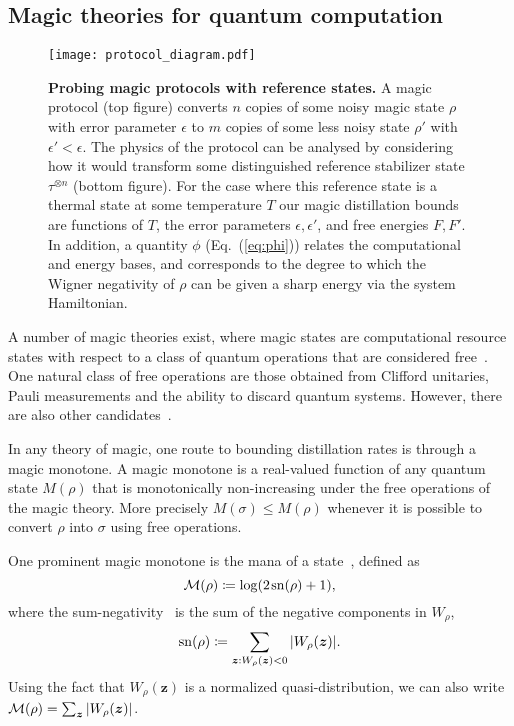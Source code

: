 \documentclass[
onecolumn,
superscriptaddress
]{revtex4-1}
\def\z{\boldsymbol{z}}
\def\M{{\cal M}}
\begin{document}
\subsection*{Magic theories for quantum computation}
\begin{figure}[t]
    \centering
        \texttt{[image: protocol\_diagram.pdf]}
    \caption{\textbf{Probing magic protocols with reference states.} 
	A magic protocol (top figure) converts $n$ copies of some noisy magic state $\rho$ with error parameter $\epsilon$ to $m$ copies of some less noisy state $\rho'$ with $\epsilon' < \epsilon$. The physics of the protocol can be analysed by considering how it would transform some distinguished reference stabilizer state $\tau^{\otimes n}$ (bottom figure). For the case where this reference state is a thermal state at some temperature $T$ our magic distillation bounds are functions of $T$, the error parameters $\epsilon, \epsilon'$, and free energies $F, F'$. In addition, a quantity $\phi$ (Eq.~(\ref{eq:phi})) relates the computational and energy bases, and corresponds to the degree to which the Wigner negativity of $\rho$ can be given a sharp energy via the system Hamiltonian.}
    \label{fig:sketch}
\end{figure}
A number of magic theories exist, where magic states are computational resource states with respect to a class of quantum operations that are considered free~\cite{Gour_2019}. One natural class of free operations are those obtained from Clifford unitaries, Pauli measurements and the ability to discard quantum systems. However, there are also other candidates~\cite{cit:ahmadi, cit:seddon, Wang_2019}.

In any theory of magic, one route to bounding distillation rates is through a magic monotone. A magic monotone is a real-valued function of any quantum state $M(\rho)$ that is monotonically non-increasing under the free operations of the magic theory. More precisely $M(\sigma) \le M(\rho)$ whenever it is possible to convert $\rho$ into $\sigma$ using free operations.

One prominent magic monotone is the mana of a state~\cite{cit:veitch2}, defined as
\begin{equation}
    \M(\rho) \coloneqq \log (2\hspace{1pt}{\rm sn}(\rho)+1),
\end{equation}
where the sum-negativity~\cite{cit:veitch2} is the sum of the negative components in $W_\rho$,
\begin{equation}
    {\rm sn}(\rho) \coloneqq \sum\limits_{\z: W_\rho(\z) < 0} \abs{W_\rho(\z)}.
\end{equation}
Using the fact that $W_\rho(\z)$ is a normalized quasi-distribution, we can also write $\M(\rho) = \sum_{\z} |W_\rho(\z)|$.
\end{document}
